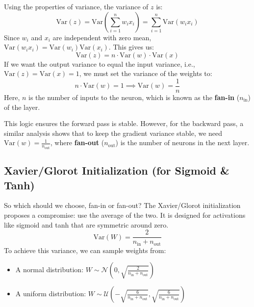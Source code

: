 \documentclass{article}
\begin{document}
Using the properties of variance, the variance of $z$ is:
\begin{equation}
    \text{Var}(z) = \text{Var}\left(\sum_{i=1}^{n} w_i x_i\right) = \sum_{i=1}^{n} \text{Var}(w_i x_i)
\end{equation}
Since $w_i$ and $x_i$ are independent with zero mean, $\text{Var}(w_i x_i) = \text{Var}(w_i)\text{Var}(x_i)$. This gives us:
\begin{equation}
    \text{Var}(z) = n \cdot \text{Var}(w) \cdot \text{Var}(x)
\end{equation}
If we want the output variance to equal the input variance, i.e., $\text{Var}(z) = \text{Var}(x) = 1$, we must set the variance of the weights to:
\begin{equation}
    n \cdot \text{Var}(w) = 1 \implies \text{Var}(w) = \frac{1}{n}
\end{equation}
Here, $n$ is the number of inputs to the neuron, which is known as the \textbf{fan-in} ($n_{\text{in}}$) of the layer.

This logic ensures the forward pass is stable. However, for the backward pass, a similar analysis shows that to keep the gradient variance stable, we need $\text{Var}(w) = \frac{1}{n_{\text{out}}}$, where \textbf{fan-out} ($n_{\text{out}}$) is the number of neurons in the next layer.

\subsection{Xavier/Glorot Initialization (for Sigmoid \& Tanh)}

So which should we choose, fan-in or fan-out? The Xavier/Glorot initialization proposes a compromise: use the average of the two. It is designed for activations like sigmoid and tanh that are symmetric around zero.
\begin{equation}
    \text{Var}(W) = \frac{2}{n_{\text{in}} + n_{\text{out}}}
\end{equation}
To achieve this variance, we can sample weights from:
\begin{itemize}
    \item A normal distribution: $W \sim \mathcal{N}\left(0, \sqrt{\frac{2}{n_{\text{in}} + n_{\text{out}}}}\right)$
    \item A uniform distribution: $W \sim \mathcal{U}\left(-\sqrt{\frac{6}{n_{\text{in}} + n_{\text{out}}}}, \sqrt{\frac{6}{n_{\text{in}} + n_{\text{out}}}}\right)$
\end{itemize}
\end{document}
